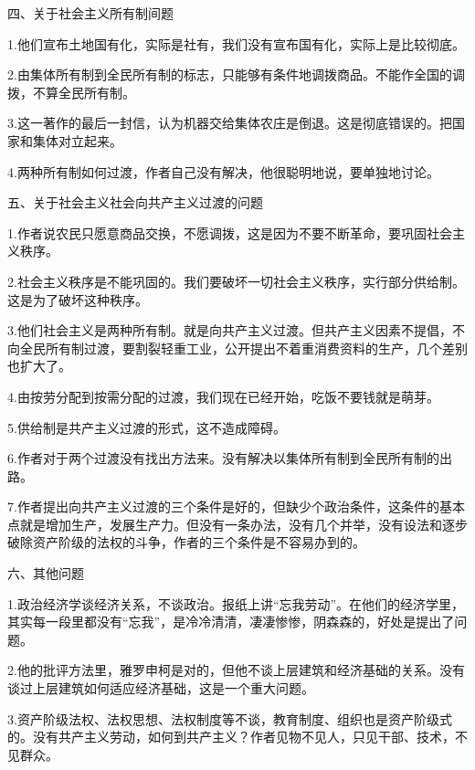 四、关于社会主义所有制间题

1.他们宣布土地国有化，实际是社有，我们没有宣布国有化，实际上是比较彻底。

2.由集体所有制到全民所有制的标志，只能够有条件地调拨商品。不能作全国的调拨，不算全民所有制。

3.这一著作的最后一封信，认为机器交给集体农庄是倒退。这是彻底错误的。把国家和集体对立起来。

4.两种所有制如何过渡，作者自己没有解决，他很聪明地说，要单独地讨论。

五、关于社会主义社会向共产主义过渡的问题

1.作者说农民只愿意商品交换，不愿调拨，这是因为不要不断革命，要巩固社会主义秩序。

2.社会主义秩序是不能巩固的。我们要破坏一切社会主义秩序，实行部分供给制。这是为了破坏这种秩序。

3.他们社会主义是两种所有制。就是向共产主义过渡。但共产主义因素不提倡，不向全民所有制过渡，要割裂轻重工业，公开提出不着重消费资料的生产，几个差别也扩大了。

4.由按劳分配到按需分配的过渡，我们现在已经开始，吃饭不要钱就是萌芽。

5.供给制是共产主义过渡的形式，这不造成障碍。

6.作者对于两个过渡没有找出方法来。没有解决以集体所有制到全民所有制的出路。

7.作者提出向共产主义过渡的三个条件是好的，但缺少个政治条件，这条件的基本点就是增加生产，发展生产力。但没有一条办法，没有几个并举，没有设法和逐步破除资产阶级的法权的斗争，作者的三个条件是不容易办到的。

六、其他问题

1.政治经济学谈经济关系，不谈政治。报纸上讲“忘我劳动”。在他们的经济学里，其实每一段里都没有“忘我”，是冷冷清清，凄凄惨惨，阴森森的，好处是提出了问题。

2.他的批评方法里，雅罗申柯是对的，但他不谈上层建筑和经济基础的关系。没有谈过上层建筑如何适应经济基础，这是一个重大问题。

3.资产阶级法权、法权思想、法权制度等不谈，教育制度、组织也是资产阶级式的。没有共产主义劳动，如何到共产主义？作者见物不见人，只见干部、技术，不见群众。


